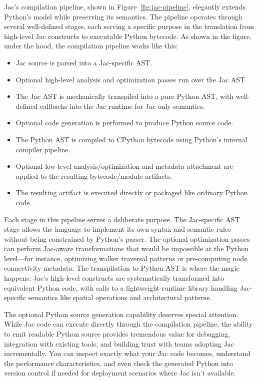 Jac's compilation pipeline, shown in Figure~\ref{fig:jac-pipeline}, elegantly extends Python's model while preserving its semantics. The pipeline operates through several well-defined stages, each serving a specific purpose in the translation from high-level Jac constructs to executable Python bytecode. As shown in the figure, under the hood, the compilation pipeline works like this:

\begin{itemize}
    \item Jac source is parsed into a Jac-specific AST.
    \item Optional high-level analysis and optimization passes run over the Jac AST.
    \item The Jac AST is mechanically transpiled into a pure Python AST, with well-defined callbacks into the Jac runtime for Jac-only semantics.
    \item Optional code generation is performed to produce Python source code.
    \item The Python AST is compiled to CPython bytecode using Python's internal compiler pipeline.
    \item Optional low-level analysis/optimization and metadata attachment are applied to the resulting bytecode/module artifacts.
    \item The resulting artifact is executed directly or packaged like ordinary Python code.
\end{itemize}

Each stage in this pipeline serves a deliberate purpose. The Jac-specific AST stage allows the language to implement its own syntax and semantic rules without being constrained by Python's parser. The optional optimization passes can perform Jac-aware transformations that would be impossible at the Python level—for instance, optimizing walker traversal patterns or pre-computing node connectivity metadata. The transpilation to Python AST is where the magic happens: Jac's high-level constructs are systematically transformed into equivalent Python code, with calls to a lightweight runtime library handling Jac-specific semantics like spatial operations and architectural patterns.

The optional Python source generation capability deserves special attention. While Jac code can execute directly through the compilation pipeline, the ability to emit readable Python source provides tremendous value for debugging, integration with existing tools, and building trust with teams adopting Jac incrementally. You can inspect exactly what your Jac code becomes, understand the performance characteristics, and even check the generated Python into version control if needed for deployment scenarios where Jac isn't available.

